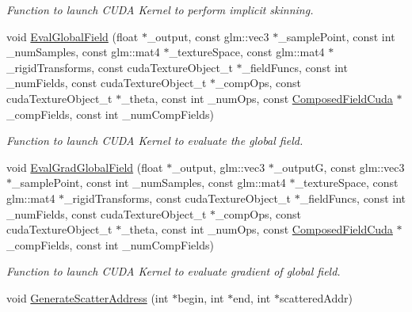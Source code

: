 \begin{DoxyCompactItemize}
\begin{DoxyCompactList}\small\item\em Function to launch C\+U\+DA Kernel to perform implicit skinning. \end{DoxyCompactList}\item 
void \hyperlink{namespaceisgw_a8eed7cf9e253eaf6b3e9651fdc3deb28}{Eval\+Global\+Field} (float $\ast$\+\_\+output, const glm\+::vec3 $\ast$\+\_\+sample\+Point, const int \+\_\+num\+Samples, const glm\+::mat4 $\ast$\+\_\+texture\+Space, const glm\+::mat4 $\ast$\+\_\+rigid\+Transforms, const cuda\+Texture\+Object\+\_\+t $\ast$\+\_\+field\+Funcs, const int \+\_\+num\+Fields, const cuda\+Texture\+Object\+\_\+t $\ast$\+\_\+comp\+Ops, const cuda\+Texture\+Object\+\_\+t $\ast$\+\_\+theta, const int \+\_\+num\+Ops, const \hyperlink{classComposedFieldCuda}{Composed\+Field\+Cuda} $\ast$\+\_\+comp\+Fields, const int \+\_\+num\+Comp\+Fields)
\begin{DoxyCompactList}\small\item\em Function to launch C\+U\+DA Kernel to evaluate the global field. \end{DoxyCompactList}\item 
void \hyperlink{namespaceisgw_ad3f1a323ddd56e99eea0afe0d7fd42f0}{Eval\+Grad\+Global\+Field} (float $\ast$\+\_\+output, glm\+::vec3 $\ast$\+\_\+outputG, const glm\+::vec3 $\ast$\+\_\+sample\+Point, const int \+\_\+num\+Samples, const glm\+::mat4 $\ast$\+\_\+texture\+Space, const glm\+::mat4 $\ast$\+\_\+rigid\+Transforms, const cuda\+Texture\+Object\+\_\+t $\ast$\+\_\+field\+Funcs, const int \+\_\+num\+Fields, const cuda\+Texture\+Object\+\_\+t $\ast$\+\_\+comp\+Ops, const cuda\+Texture\+Object\+\_\+t $\ast$\+\_\+theta, const int \+\_\+num\+Ops, const \hyperlink{classComposedFieldCuda}{Composed\+Field\+Cuda} $\ast$\+\_\+comp\+Fields, const int \+\_\+num\+Comp\+Fields)
\begin{DoxyCompactList}\small\item\em Function to launch C\+U\+DA Kernel to evaluate gradient of global field. \end{DoxyCompactList}\item 
void \hyperlink{namespaceisgw_a267fc0628a2245c86afb303701f45ddc}{Generate\+Scatter\+Address} (int $\ast$begin, int $\ast$end, int $\ast$scattered\+Addr)\hypertarget{namespaceisgw_a267fc0628a2245c86afb303701f45ddc}{}\label{namespaceisgw_a267fc0628a2245c86afb303701f45ddc}


\end{DoxyCompactItemize}
